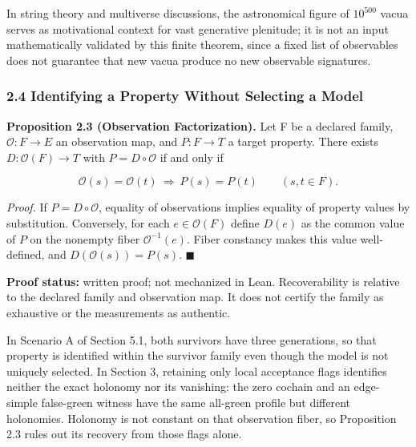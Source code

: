 \documentclass[
  10pt,
]{article}
\begin{document}
In string theory and multiverse discussions, the astronomical figure of \hypertarget{math-E0009-0064}{}{\(10^{500}\)} vacua serves as motivational context for vast generative plenitude; it is not an input mathematically validated by this finite theorem, since a fixed list of observables does not guarantee that new vacua produce no new observable signatures.

\subsubsection{2.4 Identifying a Property Without Selecting a Model}\label{identifying-a-property-without-selecting-a-model}

\textbf{Proposition 2.3 (Observation Factorization).} Let F be a declared family, \hypertarget{math-E0052-0065}{}{\(\mathcal O:F\to E\)} an observation map, and \hypertarget{math-E0053-0066}{}{\(P:F\to T\)} a target property. There exists \hypertarget{math-E0054-0067}{}{\(D:\mathcal O(F)\to T\)} with \hypertarget{math-E0055-0068}{}{\(P=D\circ\mathcal O\)} if and only if

\hypertarget{math-E0056-0069}{}{\[\mathcal O(s)=\mathcal O(t)\ \Longrightarrow\ P(s)=P(t)\qquad(s,t\in F).\]}

\emph{Proof.} If \hypertarget{math-E0055-0070}{}{\(P=D\circ\mathcal O\)}, equality of observations implies equality of property values by substitution. Conversely, for each \hypertarget{math-E0057-0071}{}{\(e\in\mathcal O(F)\)} define \hypertarget{math-E0058-0072}{}{\(D(e)\)} as the common value of \hypertarget{math-E0059-0073}{}{\(P\)} on the nonempty fiber \hypertarget{math-E0060-0074}{}{\(\mathcal O^{-1}(e)\)}. Fiber constancy makes this value well-defined, and \hypertarget{math-E0061-0075}{}{\(D(\mathcal O(s))=P(s)\)}. \hypertarget{math-E0035-0076}{}{\(\blacksquare\)}

\textbf{Proof status:} written proof; not mechanized in Lean. Recoverability is relative to the declared family and observation map. It does not certify the family as exhaustive or the measurements as authentic.

In Scenario A of Section 5.1, both survivors have three generations, so that property is identified within the survivor family even though the model is not uniquely selected. In Section 3, retaining only local acceptance flags identifies neither the exact holonomy nor its vanishing: the zero cochain and an edge-simple false-green witness have the same all-green profile but different holonomies. Holonomy is not constant on that observation fiber, so Proposition 2.3 rules out its recovery from those flags alone.
\end{document}
